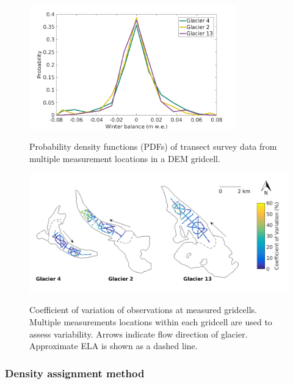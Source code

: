 \documentclass{sfuthesis}
\begin{document}
{\begin{figure}[H]
	\centering
	\includegraphics[width =0.8\textwidth]{SWEvarMeasureLocHIST.png}\\
	\caption{Probability density functions (PDFs) of transect survey data from multiple measurement locations in a DEM gridcell.}
	\label{fig:SWEvar_MultLoc_hist}
\end{figure}

\begin{figure}[H]
	\centering
	\includegraphics[width =\textwidth]{Map_cellstd_measureLoc.png}\\
	\caption[Coefficient of variation of observations at measured gridcells]{Coefficient of variation of observations at measured gridcells. Multiple measurements locations within each gridcell are used to assess variability. Arrows indicate flow direction of glacier. Approximate ELA is shown as a dashed line.}
	\label{fig:SWEvar_MultLoc_map}
\end{figure}



\subsubsection{Density assignment method}

}
\end{document}
